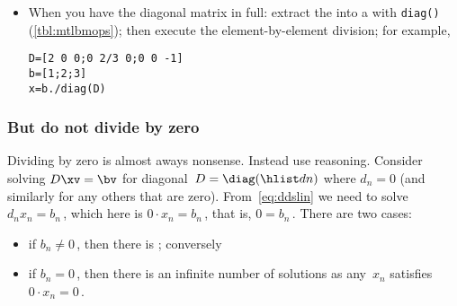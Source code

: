 \begin{compute}
\begin{itemize}
\item When you have the diagonal matrix in full:  extract the  into a  with \verb|diag()| (\autoref{tbl:mtlbmops});  then execute the element-by-element division; for example,
\setbox\ajrqrbox\hbox{}%
\marginpar{\usebox{\ajrqrbox\\[2ex]}}%
\begin{verbatim}
D=[2 0 0;0 2/3 0;0 0 -1]
b=[1;2;3]
x=b./diag(D)
\end{verbatim}
\end{itemize}

\end{compute}






\subsubsection{But do not divide by zero} 
Dividing by zero is almost aways nonsense.
Instead use reasoning.
Consider solving \(D\xv=\bv\) for diagonal~\(D=\diag(\hlist dn)\) where \(d_n=0\) (and similarly for any others that are zero).
From~\eqref{eq:ddslin} we need to solve \(d_nx_n=b_n\)\,, which here is \(0\cdot x_n=b_n\)\,, that is, \(0=b_n\)\,. 
There are two cases: 
\begin{itemize}
\item if \(b_n\neq 0\)\,, then there is ; conversely
\item if \(b_n=0\)\,, then there is an infinite number of solutions as any~\(x_n\) satisfies \(0\cdot x_n=0\)\,.
\end{itemize}





